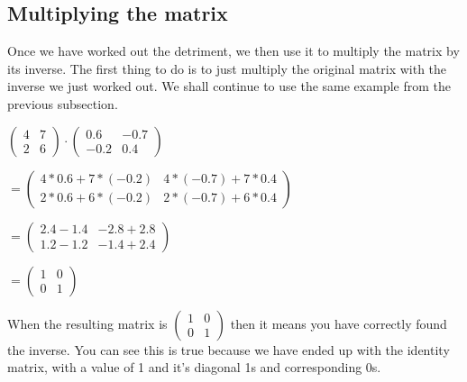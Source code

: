 \documentclass[options]{article}
\begin{document}
\subsection{Multiplying the matrix}
Once we have worked out the detriment, we then use it to multiply the matrix by its inverse. The first thing to do is to just multiply the original matrix with the inverse we just worked out.
We shall continue to use the same example from the previous subsection. 
\begin{center}
    \(
        \begin{pmatrix}
            4 & 7\\
            2 & 6
        \end{pmatrix}
        \cdot
        \begin{pmatrix}
            0.6 & -0.7\\
            -0.2 & 0.4
        \end{pmatrix}
    \)

    \(
        =
        \begin{pmatrix}
            4 * 0.6 + 7 * (-0.2) & 4 * (-0.7) + 7 * 0.4\\
            2 * 0.6 + 6 * (-0.2) & 2 * (-0.7) + 6 * 0.4
        \end{pmatrix}
    \)

    \(
        = 
        \begin{pmatrix}
            2.4 - 1.4 & -2.8 + 2.8\\
            1.2 - 1.2 & -1.4 + 2.4
        \end{pmatrix}
    \)

    \(
        =
        \begin{pmatrix}
            1 & 0\\
            0 & 1
        \end{pmatrix}
    \)
\end{center}
When the resulting matrix is \( \begin{pmatrix} 1 & 0\\0 & 1 \end{pmatrix} \) then it means you have correctly found the inverse.
You can see this is true because we have ended up with the identity matrix, with a value of 1 and it's diagonal 1s and corresponding 0s.
\end{document}
